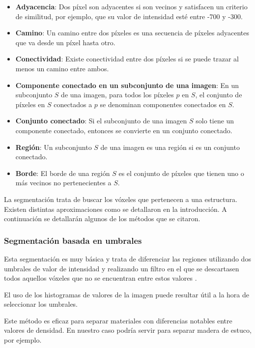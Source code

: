 \begin{itemize}
	\item \textbf{Adyacencia}: Dos píxel son adyacentes si son vecinos y satisfacen un criterio de similitud, por ejemplo, que su valor de intensidad esté entre -700 y -300.
	\item \textbf{Camino}: Un camino entre dos píxeles es una secuencia de píxeles adyacentes que va desde un píxel hasta otro.
	\item \textbf{Conectividad}: Existe conectividad entre dos píxeles si se puede trazar al menos un camino entre ambos.
	\item \textbf{Componente conectado en un subconjunto de una imagen}: En un subconjunto $S$ de una imagen, para todos los píxeles $p$ en $S$, el conjunto de píxeles en $S$ conectados a $p$ se denominan componentes conectados en $S$.
	\item \textbf{Conjunto conectado}: Si el subconjunto de una imagen $S$ solo tiene un componente conectado, entonces se convierte en un conjunto conectado.
	\item \textbf{Región}: Un subconjunto $S$ de una imagen es una región si es un conjunto conectado.
	\item \textbf{Borde}: El borde de una región $S$ es el conjunto de píxeles que tienen uno o más vecinos no pertenecientes a $S$.
\end{itemize}

La segmentación trata de buscar los vóxeles que pertenecen a una estructura. Existen distintas aproximaciones como se detallaron en la introducción. A continuación se detallarán algunos de los métodos que se citaron.

\subsubsection{Segmentación basada en umbrales}

Esta segmentación es muy básica y trata de diferenciar las regiones utilizando dos umbrales de valor de intensidad y realizando un filtro en el que se descartasen todos aquellos vóxeles que no se encuentran entre estos valores \cite{otsu79}.

El uso de los histogramas de valores de la imagen puede resultar útil a la hora de seleccionar los umbrales.

Este método es eficaz para separar materiales con diferencias notables entre valores de densidad. En nuestro caso podría servir para separar madera de estuco, por ejemplo.

